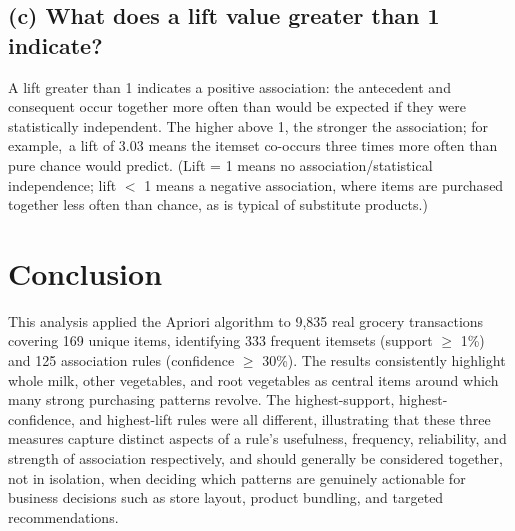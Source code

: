 \documentclass[11pt]{article}
\begin{document}
\subsection*{(c) What does a lift value greater than 1 indicate?}
A lift greater than 1 indicates a positive association: the antecedent and consequent occur together more often than would be expected if they were statistically independent. The higher above 1, the stronger the association; for example,\ a lift of 3.03 means the itemset co-occurs three times more often than pure chance would predict. (Lift = 1 means no association/statistical independence; lift $<$ 1 means a negative association, where items are purchased together less often than chance, as is typical of substitute products.)

\section*{Conclusion}
This analysis applied the Apriori algorithm to 9,835 real grocery transactions covering 169 unique items, identifying 333 frequent itemsets (support $\geq$ 1\%) and 125 association rules (confidence $\geq$ 30\%). The results consistently highlight whole milk, other vegetables, and root vegetables as central items around which many strong purchasing patterns revolve. The highest-support, highest-confidence, and highest-lift rules were all different, illustrating that these three measures capture distinct aspects of a rule's usefulness, frequency, reliability, and strength of association respectively, and should generally be considered together, not in isolation, when deciding which patterns are genuinely actionable for business decisions such as store layout, product bundling, and targeted recommendations.
\end{document}
